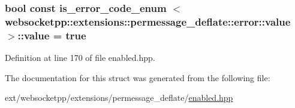 \subsubsection[{value}]{\setlength{\rightskip}{0pt plus 5cm}bool const is\+\_\+error\+\_\+code\+\_\+enum    $<$ {\bf websocketpp\+::extensions\+::permessage\+\_\+deflate\+::error\+::value} $>$\+::value = true\hspace{0.3cm}{\ttfamily [static]}}\label{structis__error__code__enum_01_01_01_01_3_01websocketpp_1_1extensions_1_1permessage__deflate_1_1error_1_1value_01_4_a40d6a9879d46788c2400b2152c808580}


Definition at line 170 of file enabled.\+hpp.



The documentation for this struct was generated from the following file\+:\begin{DoxyCompactItemize}
\item 
ext/websocketpp/extensions/permessage\+\_\+deflate/\hyperlink{enabled_8hpp}{enabled.\+hpp}\end{DoxyCompactItemize}
